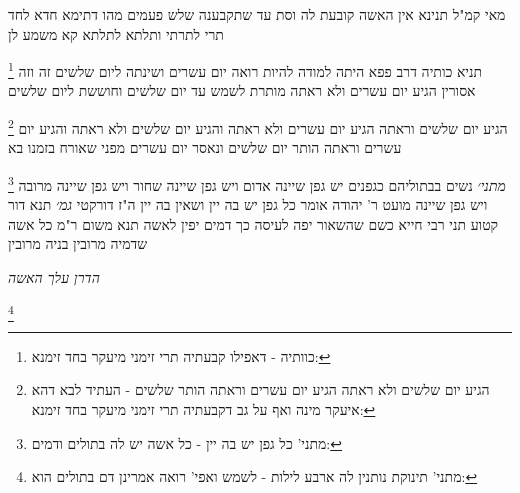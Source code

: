 \documentclass[12pt, openany]{book}
\newcommand{\footnotecomment}[1]{
	\renewcommand\thefootnote{}
	\footnote{#1}}
\newcommand{\commenta}[1]{\footnotecomment{#1}}
\begin{document}
{מאי קמ"ל תנינא אין האשה קובעת לה וסת עד שתקבענה שלש פעמים מהו דתימא חדא לחד תרי לתרתי ותלתא לתלתא קא משמע לן 
\commenta{כוותיה - דאפילו קבעתיה תרי זימני מיעקר בחד זימנא:}
תניא כותיה דרב פפא היתה למודה להיות רואה יום עשרים ושינתה ליום שלשים זה וזה אסורין הגיע יום עשרים ולא ראתה מותרת לשמש עד יום שלשים וחוששת ליום שלשים 
\commenta{הגיע יום שלשים ולא ראתה הגיע יום עשרים וראתה הותר שלשים - העתיד לבא דהא איעקר מינה ואף על גב דקבעתיה תרי זימני מיעקר בחד זימנא:}
הגיע יום שלשים וראתה הגיע יום עשרים ולא ראתה והגיע יום שלשים ולא ראתה והגיע יום עשרים וראתה הותר יום שלשים
ונאסר יום עשרים מפני שאורח בזמנו בא 
\commenta{מתני' כל גפן יש בה יין - כל אשה יש לה בתולים ודמים:}
{\large\emph{מתני׳}} נשים בבתוליהם כגפנים יש גפן שיינה אדום ויש גפן שיינה שחור ויש גפן שיינה מרובה ויש גפן שיינה מועט ר' יהודה אומר כל גפן יש בה יין ושאין בה יין ה"ז דורקטי
{\large\emph{גמ׳}} תנא דור קטוע תני רבי חייא כשם שהשאור יפה לעיסה כך דמים יפין לאשה תנא משום ר"מ כל אשה שדמיה מרובין בניה מרובין
\par \par {\large\emph{הדרן עלך האשה}}\par \par 
\commenta{מתני' תינוקת נותנין לה ארבע לילות - לשמש ואפי' רואה אמרינן דם בתולים הוא:}

}
\end{document}
